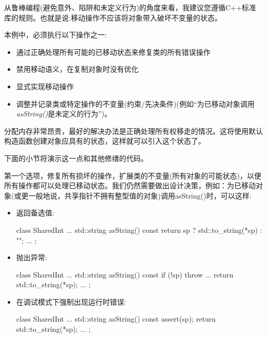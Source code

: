从鲁棒编程(避免意外、陷阱和未定义行为)的角度来看，我建议您遵循C++标准库的规则。也就是说:移动操作不应该将对象带入破坏不变量的状态。\par

本例中，必须执行以下操作之一:\par

\begin{itemize}
  \item 通过正确处理所有可能的已移动状态来修复类的所有错误操作
  \item 禁用移动语义，在复制对象时没有优化
  \item 显式实现移动操作
  \item 调整并记录类或特定操作的不变量(约束/先决条件)(例如“为已移动对象调用\textit{asString()}是未定义的行为”)。
\end{itemize}

分配内存非常昂贵，最好的解决办法是正确处理所有权移走的情况。这将使用默认构造函数创建对象应具有的状态，这样就可以引入这个状态了。\par

下面的小节将演示这一点和其他修缮的代码。\par


第一个选项，修复所有损坏的操作，扩展类的不变量(所有对象的可能状态)，以便所有操作都可以处理已移动状态。我们仍然需要做出设计决策，例如：为已移动对象(或更一般地说，共享指针不拥有整型值的对象)调用asString()时，可以这样:\par

\begin{itemize}
  \item 返回备选值:\par
\begin{codebox}[cpp]
  class SharedInt {
    ...
    std::string asString() const {
      return sp ? std::to_string(*sp) : "";
    }
    ...
  };
\end{codebox}
  \item 抛出异常:\par
\begin{codebox}[cpp]
  class SharedInt {
    ...
    std::string asString() const {
      if (!sp) throw ...
      return std::to_string(*sp);
    }
    ...
  };
\end{codebox}
  \item 在调试模式下强制出现运行时错误:\par
\begin{codebox}[cpp]
  class SharedInt {
    ...
    std::string asString() const {
      assert(sp);
      return std::to_string(*sp);
    }
    ...
  };
\end{codebox}
\end{itemize}

